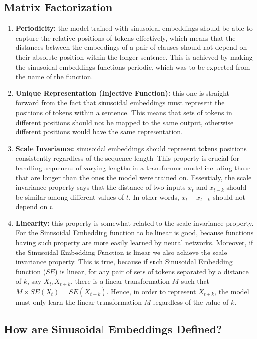 \documentclass{article}
\begin{document}
\subsection{Matrix Factorization}

\begin{enumerate}
	\item \textbf{Periodicity:} the model trained with sinusoidal embeddings should be able to capture the relative positions of tokens effectively, which means that the distances between the embeddings of a pair of clauses should not depend on their absolute position within the longer sentence. This is achieved by making the sinusoidal embeddings functions periodic, which was to be expected from the name of the function. 
	\item \textbf{Unique Representation (Injective Function):} this one is straight forward from the fact that  sinusoidal embeddings must represent the positions of tokens within a sentence. This means that sets of tokens in different positions should not be mapped to the same output, otherwise different positions would have the same representation.
	\item \textbf{Scale Invariance:} sinusoidal embeddings should represent tokens positions consistently regardless of the sequence length. This property is crucial for handling sequences of varying lengths in a transformer model including those that are longer than the ones the model were trained on. Essentialy, the scale invariance property says that the distance of two inputs $x_t$ and $x_{t - k}$ should be similar among different values of $t$. In other words, $x_t - x_{t - k}$ should not depend on $t$.
	\item \textbf{Linearity:} this property is somewhat related to the scale invariance property. For the Sinusoidal Embedding function to be linear is good, because functions having such property are more easily learned by neural networks. Moreover, if the Sinusoidal Embedding Function is linear we also achieve the scale invariance property. This is true, because if such Sinusoidal Embedding function ($SE$) is linear, for any pair of sets of tokens separated by a distance of $k$, say $X_t, X_{t+k}$, there is a linear transformation $M$ such that $M \times SE(X_t) = SE(X_{t+k})$. Hence, in order to represent $X_{t+k}$,  the model must only learn the linear transformation $M$ regardless of the value of $k$. 
\end{enumerate}


\subsection{How are Sinusoidal Embeddings Defined?}
\end{document}
